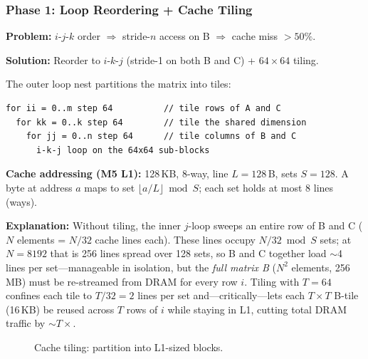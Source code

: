 \documentclass[11pt,a4paper]{article}
\begin{document}
\subsubsection{Phase 1: Loop Reordering + Cache Tiling}

\textbf{Problem:} $i$-$j$-$k$ order $\Rightarrow$ stride-$n$ access on B $\Rightarrow$ cache miss $>50\%$.

\textbf{Solution:} Reorder to $i$-$k$-$j$ (stride-1 on both B and C) + $64\times64$ tiling.

The outer loop nest partitions the matrix into tiles:
\begin{lstlisting}[language={},basicstyle=\ttfamily\scriptsize,frame=single,numbers=none]
for ii = 0..m step 64          // tile rows of A and C
  for kk = 0..k step 64        // tile the shared dimension
    for jj = 0..n step 64      // tile columns of B and C
      i-k-j loop on the 64x64 sub-blocks
\end{lstlisting}

\textbf{Cache addressing (M5 L1):}
128\,KB, 8-way, line $L{=}128$\,B, sets $S{=}128$.
A byte at address $a$ maps to set $\lfloor a/L \rfloor \bmod S$;
each set holds at most 8 lines (ways).

\textbf{Explanation:}
Without tiling, the inner $j$-loop sweeps an entire row of B and C ($N$ elements = $N/32$ cache lines each).
These lines occupy $N/32 \bmod S$ sets; at $N{=}8192$ that is 256 lines spread over 128 sets, so B and C together load $\sim$4 lines per set---manageable in isolation, but the \emph{full matrix B} ($N^2$ elements, 256\,MB) must be re-streamed from DRAM for every row $i$.
Tiling with $T{=}64$ confines each tile to $T/32{=}2$ lines per set and---critically---lets each $T{\times}T$ B-tile (16\,KB) be reused across $T$ rows of $i$ while staying in L1, cutting total DRAM traffic by $\sim T{\times}$.

\begin{figure}[H]
\centering
{}
\caption{Cache tiling: partition into L1-sized blocks.}
\end{figure}
\end{document}

